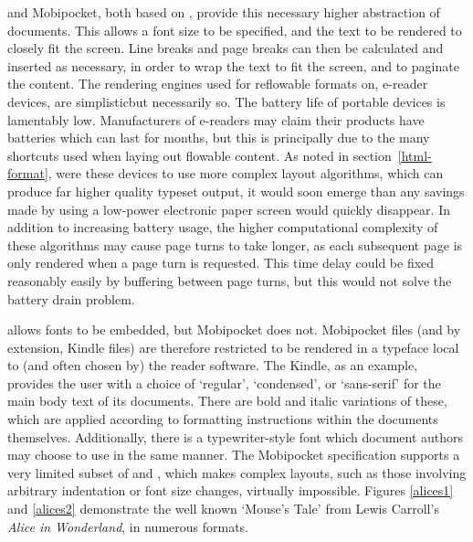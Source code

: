 \epub{} and Mobipocket, both based on \html{}, provide this necessary higher abstraction of
documents. This allows a font size to be specified, and the text to be rendered to closely fit the
screen. Line breaks and page breaks can then be calculated and inserted as necessary, in order to
wrap the text to fit the screen, and to paginate the content. The rendering engines used for
reflowable formats on, e-reader devices, are simplistic\ed but necessarily so. The battery life of
portable devices is lamentably low. Manufacturers of e-readers may claim their products have
batteries which can last for months, but this is principally due to the many shortcuts used when
laying out flowable content. As noted in section~\ref{html-format}, were these devices to use more
complex layout algorithms, which can produce far higher quality typeset output, it would soon emerge
than any savings made by using a low-power electronic paper screen would quickly disappear. In
addition to increasing battery usage, the higher computational complexity of these algorithms may
cause page turns to take longer, as each subsequent page is only rendered when a page turn is
requested. This time delay could be fixed reasonably easily by buffering between page turns, but
this would not solve the battery drain problem.







\epub{} allows fonts to be embedded, but Mobipocket does not. Mobipocket files (and by extension,
Kindle files) are therefore restricted to be rendered in a typeface local to (and often chosen by)
the reader software. The Kindle, as an example, provides the user with a choice of `regular',
`condensed', or `sans-serif' for the main body text of its documents. There are bold and italic
variations of these, which are applied according to formatting instructions within the documents
themselves. Additionally, there is a typewriter-style font which document authors may choose to use
in the same manner. The Mobipocket specification supports a very limited subset of \html{} and
\css{}, which makes complex layouts, such as those involving arbitrary indentation or font size
changes, virtually impossible. Figures \ref{alices1} and \ref{alices2} demonstrate the well known
`Mouse's Tale' from Lewis Carroll's \emph{Alice in Wonderland}, in numerous formats.


